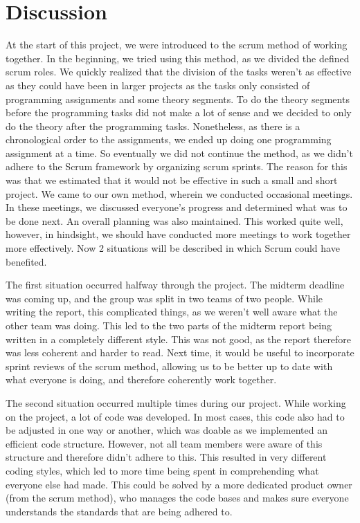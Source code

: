 \chapter{Discussion}



At the start of this project, we were introduced to the scrum method of working together. In the beginning, we tried using this method, as we divided the defined scrum roles. We quickly realized that the division of the tasks weren't as effective as they could have been in larger projects as the tasks only consisted of programming assignments and some theory segments. To do the theory segments before the programming tasks did not make a lot of sense and we decided to only do the theory after the programming tasks. Nonetheless, as there is a chronological order to the assignments, we ended up doing one programming assignment at a time. So eventually we did not continue the method, as we didn't adhere to the Scrum framework by organizing scrum sprints. The reason for this was that we estimated that it would not be effective in such a small and short project. We came to our own method, wherein we conducted occasional meetings. In these meetings, we discussed everyone's progress and determined what was to be done next. An overall planning was also maintained. This worked quite well, however, in hindsight, we should have conducted more meetings to work together more effectively. Now 2 situations will be described in which Scrum could have benefited.

The first situation occurred halfway through the project. The midterm deadline was coming up, and the group was split in two teams of two people. While writing the report, this complicated things, as we weren't well aware what the other team was doing. This led to the two parts of the midterm report being written in a completely different style. This was not good, as the report therefore was less coherent and harder to read. Next time, it would be useful to incorporate sprint reviews of the scrum method, allowing us to be better up to date with what everyone is doing, and therefore coherently work together. 

The second situation occurred multiple times during our project. While working on the project, a lot of code was developed. In most cases, this code also had to be adjusted in one way or another, which was doable as we implemented an efficient code structure. However, not all team members were aware of this structure and therefore didn't adhere to this. This resulted in very different coding styles, which led to more time being spent in comprehending what everyone else had made. This could be solved by a more dedicated product owner (from the scrum method), who manages the code bases and makes sure everyone understands the standards that are being adhered to.








